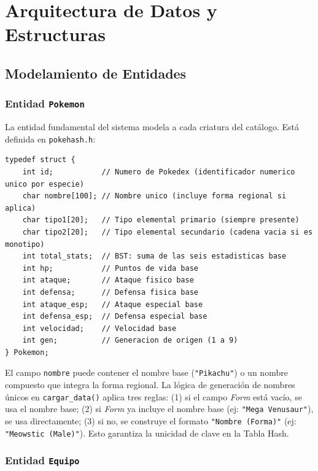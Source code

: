 \documentclass[12pt, letterpaper]{article}
\begin{document}
\section{Arquitectura de Datos y Estructuras}

\subsection{Modelamiento de Entidades}

\subsubsection{Entidad \texttt{Pokemon}}

La entidad fundamental del sistema modela a cada criatura del catálogo. Está definida en \texttt{pokehash.h}:

\begin{lstlisting}[caption={Definición del \texttt{struct Pokemon} en \texttt{pokehash.h}}]
typedef struct {
    int id;           // Numero de Pokedex (identificador numerico unico por especie)
    char nombre[100]; // Nombre unico (incluye forma regional si aplica)
    char tipo1[20];   // Tipo elemental primario (siempre presente)
    char tipo2[20];   // Tipo elemental secundario (cadena vacia si es monotipo)
    int total_stats;  // BST: suma de las seis estadisticas base
    int hp;           // Puntos de vida base
    int ataque;       // Ataque fisico base
    int defensa;      // Defensa fisica base
    int ataque_esp;   // Ataque especial base
    int defensa_esp;  // Defensa especial base
    int velocidad;    // Velocidad base
    int gen;          // Generacion de origen (1 a 9)
} Pokemon;
\end{lstlisting}

El campo \texttt{nombre} puede contener el nombre base (\texttt{"Pikachu"}) o un nombre compuesto que integra la forma regional. La lógica de generación de nombres únicos en \texttt{cargar\_data()} aplica tres reglas: (1) si el campo \emph{Form} está vacío, se usa el nombre base; (2) si \emph{Form} ya incluye el nombre base (ej: \texttt{"Mega Venusaur"}), se usa directamente; (3) si no, se construye el formato \texttt{"Nombre (Forma)"} (ej: \texttt{"Meowstic (Male)"}). Esto garantiza la unicidad de clave en la Tabla Hash.

\subsubsection{Entidad \texttt{Equipo}}
\end{document}
